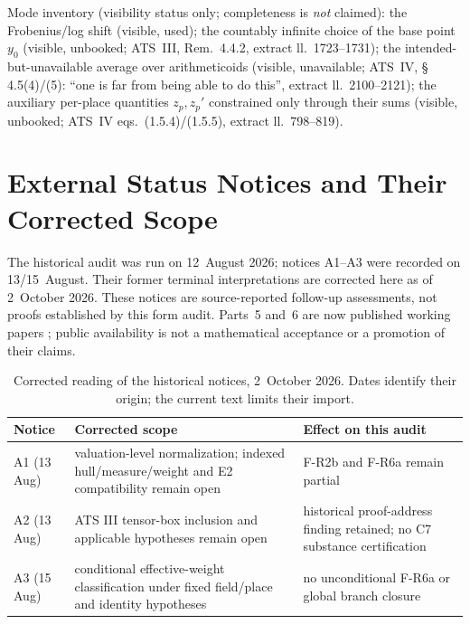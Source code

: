\documentclass[11pt,a4paper]{article}
\begin{document}
Mode inventory (visibility status only; completeness is \emph{not} claimed):
the Frobenius/log shift (visible, used); the countably infinite choice of the
base point $y_0$ (visible, unbooked; ATS~III, Rem.~4.4.2, extract
ll.~1723--1731); the intended-but-unavailable average over arithmeticoids
(visible, unavailable; ATS~IV, \S\,4.5(4)/(5): ``one is far from being able to
do this'', extract ll.~2100--2121); the auxiliary per-place quantities
$z_p, z_p'$ constrained only through their sums (visible, unbooked; ATS~IV
eqs.~(1.5.4)/(1.5.5), extract ll.~798--819).

\section{External Status Notices and Their Corrected Scope}\label{sec:notices}

The historical audit was run on 12~August 2026; notices A1--A3
were recorded on 13/15~August. Their former terminal interpretations
are corrected here as of 2~October 2026. These notices are source-reported
follow-up assessments, not proofs established by this form audit.
Parts~5 and~6 are now published working papers
\cite{part5,part6}; public availability is not a mathematical
acceptance or a promotion of their claims.

\begin{table}[htbp]
\centering\footnotesize
\begin{tabularx}{\textwidth}{@{}l >{\raggedright\arraybackslash}X >{\raggedright\arraybackslash}X@{}}
\toprule
Notice & Corrected scope & Effect on this audit \\
\midrule
A1 (13 Aug) & valuation-level normalization; indexed hull/measure/weight and E2 compatibility remain open & F-R2b and F-R6a remain partial \\
A2 (13 Aug) & ATS III tensor-box inclusion and applicable hypotheses remain open & historical proof-address finding retained; no C7 substance certification \\
A3 (15 Aug) & conditional effective-weight classification under fixed field/place and identity hypotheses & no unconditional F-R6a or global branch closure \\
\bottomrule
\end{tabularx}
\caption{Corrected reading of the historical notices, 2~October 2026.
Dates identify their origin; the current text limits their import.}
\label{tab:status-notices}
\end{table}
\end{document}
